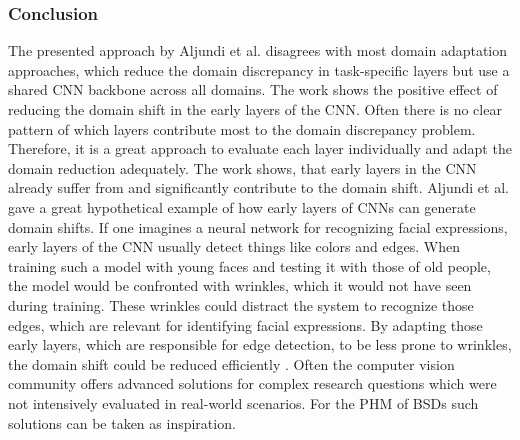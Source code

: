 \subsubsection{Conclusion}
The presented approach by Aljundi et al. \cite{Aljundi2016} disagrees with most domain adaptation approaches, which reduce the domain discrepancy in task-specific layers but use a shared CNN backbone across all domains. The work shows the positive effect of reducing the domain shift in the early layers of the CNN. Often there is no clear pattern of which layers contribute most to the domain discrepancy problem. Therefore, it is a great approach to evaluate each layer individually and adapt the domain reduction adequately. The work shows, that early layers in the CNN already suffer from and significantly contribute to the domain shift. Aljundi et al. \cite{Aljundi2016} gave a great hypothetical example of how early layers of CNNs can generate domain shifts. If one imagines a neural network for recognizing facial expressions, early layers of the CNN usually detect things like colors and edges. When training such a model with young faces and testing it with those of old people, the model would be confronted with wrinkles, which it would not have seen during training. These wrinkles could distract the system to recognize those edges, which are relevant for identifying facial expressions. By adapting those early layers, which are responsible for edge detection, to be less prone to wrinkles, the domain shift could be reduced efficiently \cite{Aljundi2016}. Often the computer vision community offers advanced solutions for complex research questions which were not intensively evaluated in real-world scenarios. For the PHM of BSDs such solutions can be taken as inspiration. 


